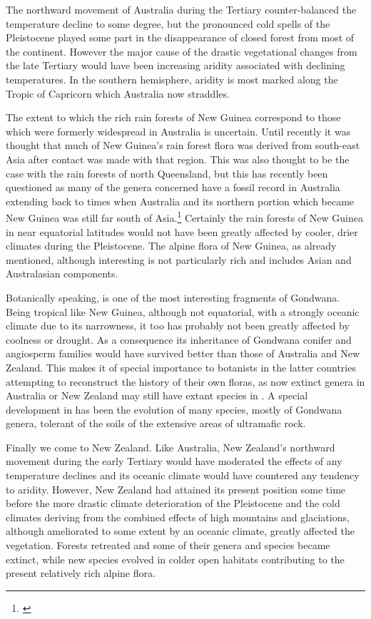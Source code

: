The northward movement of Australia during the Tertiary counter-balanced the temperature decline to some degree, but the pronounced cold spells of the Pleistocene played some part in the disappearance of closed forest from most of the continent.
However the major cause of the drastic vegetational changes from the late Tertiary would have been increasing aridity associated with declining temperatures.
In the southern hemisphere, aridity is most marked along the Tropic of Capricorn which Australia now straddles.

The extent to which the rich rain forests of New Guinea correspond to those which were formerly widespread in Australia is uncertain.
Until recently it was thought that much of New Guinea's rain forest flora was derived from south-east Asia after contact was made with that region.
This was also thought to be the case with the rain forests of north Queensland, but this has recently been questioned as many of the genera concerned have a fossil record in Australia extending back to times when Australia and its northern portion which became New Guinea was still far south of Asia.\footnote{\cite{webb1986recent}}
Certainly the rain forests of New Guinea in near equatorial latitudes would not have been greatly affected by cooler, drier climates during the Pleistocene.
The alpine flora of New Guinea, as already mentioned, although interesting is not particularly rich and includes Asian and Australasian components.

Botanically speaking,  is one of the most interesting fragments of Gondwana.
Being tropical like New Guinea, although not equatorial, with a strongly oceanic climate due to its narrowness, it too has probably not been greatly affected by coolness or drought.
As a consequence its inheritance of Gondwana conifer and angiosperm families would have survived better than those of Australia and New Zealand.
This makes it of special importance to botanists in the latter countries attempting to reconstruct the history of their own floras, as now extinct genera in Australia or New Zealand may still have extant species in .
A special development in  has been the evolution of many species, mostly of Gondwana genera, tolerant of the soils of the extensive areas of ultramafic rock.

Finally we come to New Zealand.
Like Australia, New Zealand's northward movement during the early Tertiary would have moderated the effects of any temperature declines and its oceanic climate would have countered any tendency to aridity.
However, New Zealand had attained its present position some time before the more drastic climate deterioration of the Pleistocene and the cold climates deriving from the combined effects of high mountains and glaciations, although ameliorated to some extent by an oceanic climate, greatly affected the vegetation.
Forests retreated and some of their genera and species became extinct, while new species evolved in colder open habitats contributing to the present relatively rich alpine flora.


